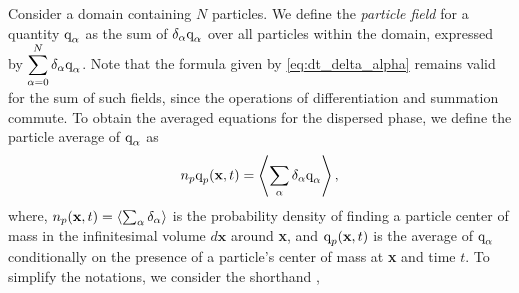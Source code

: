 Consider a domain containing $N$ particles. We define the \textit{particle field} for a quantity $\text q_\alpha$ as the sum of $\delta_\alpha \text q_\alpha$ over all particles within the domain, expressed by $\displaystyle\sum_{\alpha=0}^N \delta_\alpha \text q_\alpha$. 
Note that the formula given by \ref{eq:dt_delta_alpha} remains valid for the sum of such fields, since the operations of differentiation and summation commute.
To obtain the averaged equations for the dispersed phase, we define the particle average of $\text q_\alpha$ as
\begin{equation}
     n_p \text q_p(\textbf{x},t) = \avg{\sum_\alpha\delta_\alpha \text q_\alpha},
     \label{eq:p_avg}
\end{equation}
where, $n_p(\textbf{x},t) = \left<\sum_\alpha \delta_\alpha\right>$ is the probability density of finding a particle center of mass in the infinitesimal volume $d\textbf{x}$ around \textbf{x}, and $\text q_p(\textbf{x},t)$ is the average of $\text q_\alpha$ conditionally on the presence of a particle's center of mass at \textbf{x} and time $t$. 
To simplify the notations, we consider the shorthand \citep{lhuillier1998},
